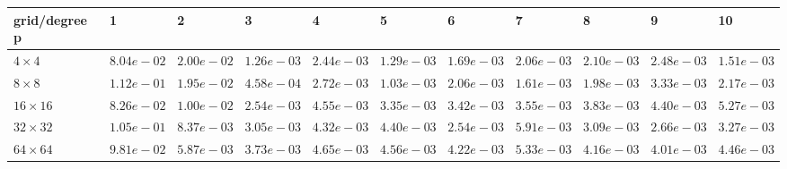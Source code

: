 \begin{tabular}{lllllllllll}
\hline
 grid/degree p   & 1          & 2          & 3          & 4          & 5          & 6          & 7          & 8          & 9          & 10         \\
\hline
 $4 \times 4$    & $8.04e-02$ & $2.00e-02$ & $1.26e-03$ & $2.44e-03$ & $1.29e-03$ & $1.69e-03$ & $2.06e-03$ & $2.10e-03$ & $2.48e-03$ & $1.51e-03$ \\
 $8 \times 8$    & $1.12e-01$ & $1.95e-02$ & $4.58e-04$ & $2.72e-03$ & $1.03e-03$ & $2.06e-03$ & $1.61e-03$ & $1.98e-03$ & $3.33e-03$ & $2.17e-03$ \\
 $16 \times 16$  & $8.26e-02$ & $1.00e-02$ & $2.54e-03$ & $4.55e-03$ & $3.35e-03$ & $3.42e-03$ & $3.55e-03$ & $3.83e-03$ & $4.40e-03$ & $5.27e-03$ \\
 $32 \times 32$  & $1.05e-01$ & $8.37e-03$ & $3.05e-03$ & $4.32e-03$ & $4.40e-03$ & $2.54e-03$ & $5.91e-03$ & $3.09e-03$ & $2.66e-03$ & $3.27e-03$ \\
 $64 \times 64$  & $9.81e-02$ & $5.87e-03$ & $3.73e-03$ & $4.65e-03$ & $4.56e-03$ & $4.22e-03$ & $5.33e-03$ & $4.16e-03$ & $4.01e-03$ & $4.46e-03$ \\
\hline
\end{tabular}